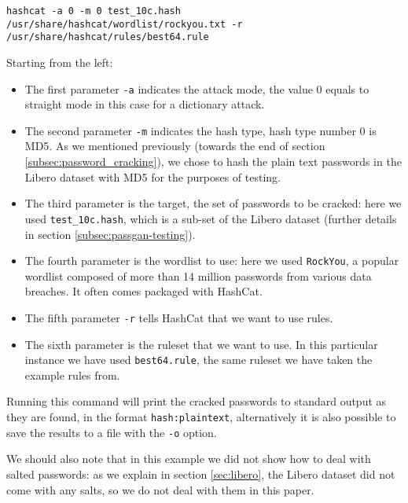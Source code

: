 \begin{lstlisting}[breaklines=true,postbreak=\mbox{\textcolor{red}{$\hookrightarrow$}\space}]
hashcat -a 0 -m 0 test_10c.hash /usr/share/hashcat/wordlist/rockyou.txt -r /usr/share/hashcat/rules/best64.rule
\end{lstlisting}

Starting from the left:
\begin{itemize}
\item The first parameter \texttt{-a} indicates the attack mode, the value 0 equals to straight mode in this case for a dictionary attack.

\item The second parameter \texttt{-m} indicates the hash type, hash type number 0 is MD5. As we mentioned previously (towards the end of section \ref{subsec:password_cracking}), we chose to hash the plain text passwords in the Libero dataset with MD5 for the purposes of testing.

\item The third parameter is the target, the set of passwords to be cracked: here we used \texttt{test\_10c.hash}, which is a sub-set of the Libero dataset (further details in section \ref{subsec:passgan-testing}).

\item The fourth parameter is the wordlist to use: here we used \texttt{RockYou}, a popular wordlist composed of more than 14 million passwords from various data breaches. It often comes packaged with HashCat.

\item The fifth parameter \texttt{-r} tells HashCat that we want to use rules.

\item The sixth parameter is the ruleset that we want to use. In this particular instance we have used \texttt{best64.rule}, the same ruleset we have taken the example rules from.    
\end{itemize}

Running this command will print the cracked passwords to standard output as they are found, in the format \texttt{hash:plaintext}, alternatively it is also possible to save the results to a file with the \texttt{-o} option.

We should also note that in this example we did not show how to deal with salted passwords: as we explain in section \ref{sec:libero}, the Libero dataset did not come with any salts, so we do not deal with them in this paper.
